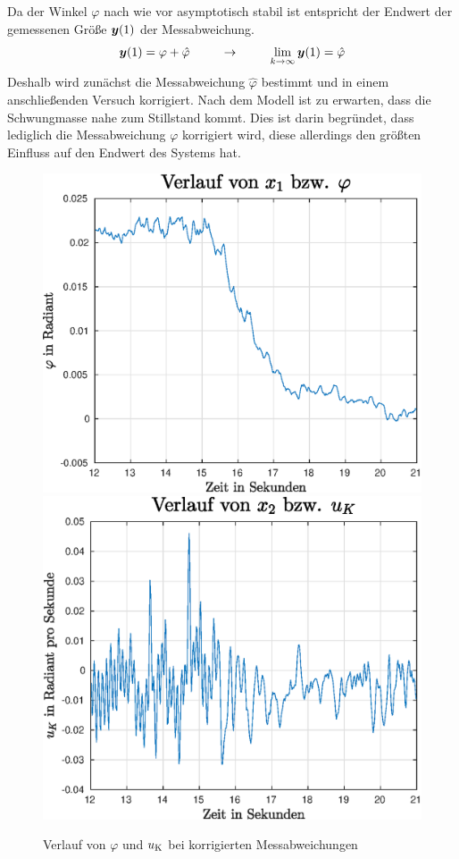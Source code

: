 Da der Winkel $\varphi$ nach wie vor asymptotisch stabil ist entspricht der Endwert der gemessenen Größe $\boldsymbol{y}(1)$ der Messabweichung.
\begin{equation}
\boldsymbol{y}(1) = \varphi + \hat{\varphi} \hspace{25pt} \rightarrow\hspace{25pt} \lim_{k\rightarrow\infty}\boldsymbol{y}(1) = \hat{\varphi}
\end{equation}
Deshalb wird zunächst die Messabweichung $\hat{\varphi}$ bestimmt und in einem anschließenden Versuch korrigiert. Nach dem Modell ist zu erwarten, dass die Schwungmasse nahe zum Stillstand kommt. Dies ist darin begründet, dass lediglich die Messabweichung $\varphi$ korrigiert wird, diese allerdings den größten Einfluss auf den Endwert des Systems hat.
\begin{figure}[h!]
\includegraphics[width=0.45\linewidth]{img/edge_exp2_phi.eps}
\includegraphics[width=0.45\linewidth]{img/edge_exp2_uk.eps}
\caption{Verlauf von $\varphi$ und $u_{\text{K}}$ bei korrigierten Messabweichungen}
\label{plot1_edge_exp2}
\end{figure}
